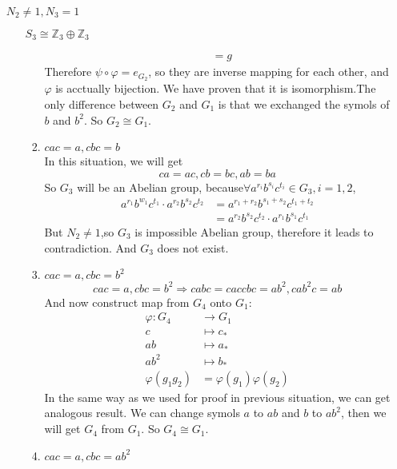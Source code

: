 \documentclass[a4paper,14pt]{article}
\begin{document}
\begin{enumerate}
\begin{item}{$N_2 \neq 1, N_3 = 1$}
\begin{enumerate}
\begin{item}{$S_3\cong \mathbb{Z}_3 \oplus \mathbb{Z}_3$}
\begin{enumerate}
\begin{align*}
                                                        &= g
                            \end{align*}
                            Therefore $\psi \circ \varphi = e_{G_2}$, so they are inverse mapping for each other, and $\varphi$ is acctually
                            bijection. We have proven that it is isomorphism.The only difference between $G_2$ and $G_1$ is
                            that we exchanged the symols of $b$ and $b^2$. So $G_2 \cong G_1$.
                        \item $cac=a, cbc=b$\\
                            In this situation, we will get
                            \[ca=ac,cb=bc,ab=ba \]
                            So $G_3$ will be an Abelian group, because$\forall a^{r_i}b^{s_i}c^{t_i} \in G_3,i = 1,2$,\\
                            \begin{align*}
                                a^{r_1}b^{w_1}c^{t_1} \cdot a^{r_2}b^{s_2}c^{t_2} &= a^{r_1+r_2}b^{s_1+s_2}c^{t_1+t_2}\\
                                                    &= a^{r_2}b^{s_2}c^{t_2} \cdot a^{r_1}b^{s_1}c^{t_1}
                            \end{align*}
                            But $N_2 \neq 1$,so $G_3$ is impossible Abelian group, therefore it leads to contradiction. And $G_3$ does not exist.
                        \item $cac=a,cbc=b^2$
                            $$cac=a,cbc=b^2 \Rightarrow cabc=caccbc=ab^2,cab^2c=ab$$
                            And now construct map from $G_4$ onto $G_1$:
                            \begin{align*}
                                \varphi:G_4 &\to G_1\\
                                c &\longmapsto c_*\\
                                ab &\longmapsto a_*\\
                                ab^2 &\longmapsto b_*\\
                                \varphi(g_1g_2) &= \varphi(g_1)\varphi(g_2)
                            \end{align*}
                            In the same way as we used for proof in previous situation, we can get analogous result.
                            We can change symols $a$ to $ab$ and $b$ to $ab^2$, then we will get $G_4$ from $G_1$. So $G_4 \cong G_1$.
                        \item $cac=a,cbc=ab^2$

\end{enumerate}
\end{item}
\end{enumerate}
\end{item}
\end{enumerate}
\end{document}
